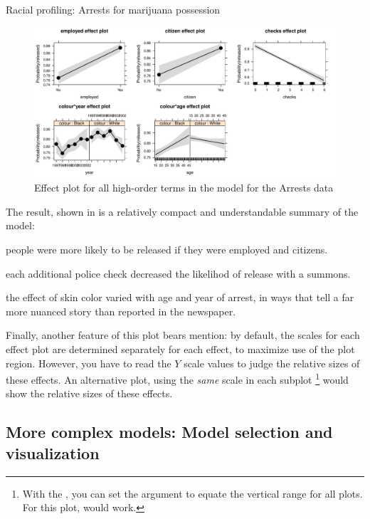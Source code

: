 \documentclass[11pt]{book}\usepackage[]{graphicx}\usepackage[]{color}
\newenvironment{knitrout}{}{} %
\renewenvironment{knitrout}{\small\renewcommand{\baselinestretch}{.85}}{} %
\begin{document}
\begin{Example}[arrests]{Racial profiling: Arrests for marijuana possession}
\begin{knitrout}
\begin{figure}[!htbp]
\centerline{\includegraphics[width=\textwidth]{ch07/fig/arrests-all-1} }

\caption[Effect plot for all high-order terms in the model for the Arrests data]{Effect plot for all high-order terms in the model for the Arrests data\label{fig:arrests-all}}
\end{figure}


\end{knitrout}

The result, shown in  is a relatively compact and understandable
summary of the  model:
\begin{seriate}
  \item people were more likely to be released if they were employed and citizens.
  \item each additional police check decreased the likelihod of release with a summons.
  \item the effect of skin color varied with age and year of arrest, in ways that
  tell a far more nuanced story than reported in the newspaper.
\end{seriate}

Finally, another feature of this plot bears mention:  by default, the scales for each
effect plot are determined separately for each effect, to maximize use of the plot region.
However, you have to read the $Y$ scale values to judge the relative sizes of these effects.
An alternative plot, using the \emph{same} scale in each subplot%
\footnote{
With the , you can set the  argument to equate the 
vertical range for all plots.  For this plot,  would work.
}
would show the relative sizes of these effects.

\end{Example}

\subsection{More complex models: Model selection and visualization}\label{sec:complex}
\end{document}
